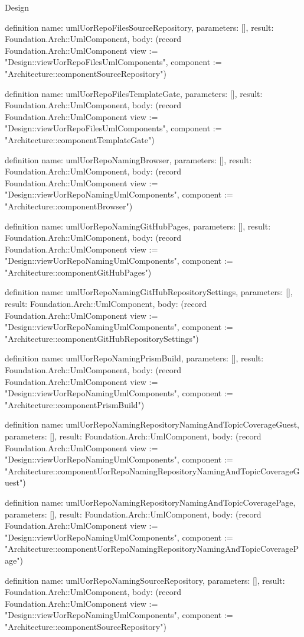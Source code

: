 \begin{lexlean}{Design}
\begin{semanticmodule}
definition{
  name: umlUorRepoFilesSourceRepository,
  parameters: [],
  result: Foundation.Arch::UmlComponent,
  body: (record Foundation.Arch::UmlComponent {view := "Design::viewUorRepoFilesUmlComponents", component := "Architecture::componentSourceRepository"})
}

definition{
  name: umlUorRepoFilesTemplateGate,
  parameters: [],
  result: Foundation.Arch::UmlComponent,
  body: (record Foundation.Arch::UmlComponent {view := "Design::viewUorRepoFilesUmlComponents", component := "Architecture::componentTemplateGate"})
}

definition{
  name: umlUorRepoNamingBrowser,
  parameters: [],
  result: Foundation.Arch::UmlComponent,
  body: (record Foundation.Arch::UmlComponent {view := "Design::viewUorRepoNamingUmlComponents", component := "Architecture::componentBrowser"})
}

definition{
  name: umlUorRepoNamingGitHubPages,
  parameters: [],
  result: Foundation.Arch::UmlComponent,
  body: (record Foundation.Arch::UmlComponent {view := "Design::viewUorRepoNamingUmlComponents", component := "Architecture::componentGitHubPages"})
}

definition{
  name: umlUorRepoNamingGitHubRepositorySettings,
  parameters: [],
  result: Foundation.Arch::UmlComponent,
  body: (record Foundation.Arch::UmlComponent {view := "Design::viewUorRepoNamingUmlComponents", component := "Architecture::componentGitHubRepositorySettings"})
}

definition{
  name: umlUorRepoNamingPrismBuild,
  parameters: [],
  result: Foundation.Arch::UmlComponent,
  body: (record Foundation.Arch::UmlComponent {view := "Design::viewUorRepoNamingUmlComponents", component := "Architecture::componentPrismBuild"})
}

definition{
  name: umlUorRepoNamingRepositoryNamingAndTopicCoverageGuest,
  parameters: [],
  result: Foundation.Arch::UmlComponent,
  body: (record Foundation.Arch::UmlComponent {view := "Design::viewUorRepoNamingUmlComponents", component := "Architecture::componentUorRepoNamingRepositoryNamingAndTopicCoverageGuest"})
}

definition{
  name: umlUorRepoNamingRepositoryNamingAndTopicCoveragePage,
  parameters: [],
  result: Foundation.Arch::UmlComponent,
  body: (record Foundation.Arch::UmlComponent {view := "Design::viewUorRepoNamingUmlComponents", component := "Architecture::componentUorRepoNamingRepositoryNamingAndTopicCoveragePage"})
}

definition{
  name: umlUorRepoNamingSourceRepository,
  parameters: [],
  result: Foundation.Arch::UmlComponent,
  body: (record Foundation.Arch::UmlComponent {view := "Design::viewUorRepoNamingUmlComponents", component := "Architecture::componentSourceRepository"})
}


\end{semanticmodule}
\end{lexlean}
